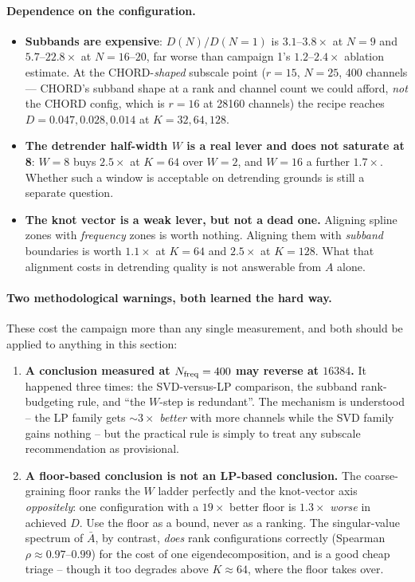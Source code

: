 \documentclass{article}
\numberwithin{equation}{section}   %
\begin{document}
\paragraph{Dependence on the configuration.}
\begin{itemize}
\item {\bf Subbands are expensive}: $D(N)/D(N{=}1)$ is $3.1$--$3.8\times$ at $N = 9$ and
 $5.7$--$22.8\times$ at $N = 16$--$20$, far worse than campaign 1's $1.2$--$2.4\times$ ablation
 estimate. At the CHORD-{\em shaped} subscale point ($r = 15$, $N = 25$, 400 channels --- CHORD's
 subband shape at a rank and channel count we could afford, {\em not} the CHORD config, which is
 $r = 16$ at 28160 channels) the recipe reaches $D = 0.047, 0.028, 0.014$ at $K = 32, 64, 128$.
\item {\bf The detrender half-width $W$ is a real lever and does not saturate at 8}: $W = 8$ buys
 $2.5\times$ at $K = 64$ over $W = 2$, and $W = 16$ a further $1.7\times$. Whether such a window
 is acceptable on detrending grounds is still a separate question.
\item {\bf The knot vector is a weak lever, but not a dead one.} Aligning spline zones with
 {\em frequency} zones is worth nothing. Aligning them with {\em subband} boundaries is worth
 $1.1\times$ at $K = 64$ and $2.5\times$ at $K = 128$. What that alignment costs in detrending
 quality is not answerable from $A$ alone.
\end{itemize}

\paragraph{Two methodological warnings, both learned the hard way.}
These cost the campaign more than any single measurement, and both should be applied to anything
in this section:

\begin{enumerate}
\item {\bf A conclusion measured at $N_{\rm freq} = 400$ may reverse at $16384$.} It happened
 three times: the SVD-versus-LP comparison, the subband rank-budgeting rule, and ``the $W$-step is
 redundant''. The mechanism is understood -- the LP family gets $\sim 3\times$ {\em better} with
 more channels while the SVD family gains nothing -- but the practical rule is simply to treat any
 subscale recommendation as provisional.
\item {\bf A floor-based conclusion is not an LP-based conclusion.} The coarse-graining floor
 ranks the $W$ ladder perfectly and the knot-vector axis {\em oppositely}: one configuration with
 a $19\times$ better floor is $1.3\times$ {\em worse} in achieved $D$. Use the floor as a bound,
 never as a ranking. The singular-value spectrum of $\bar A$, by contrast, {\em does} rank
 configurations correctly (Spearman $\rho \approx 0.97$--$0.99$) for the cost of one
 eigendecomposition, and is a good cheap triage -- though it too degrades above $K \approx 64$,
 where the floor takes over.
\end{enumerate}
\end{document}
